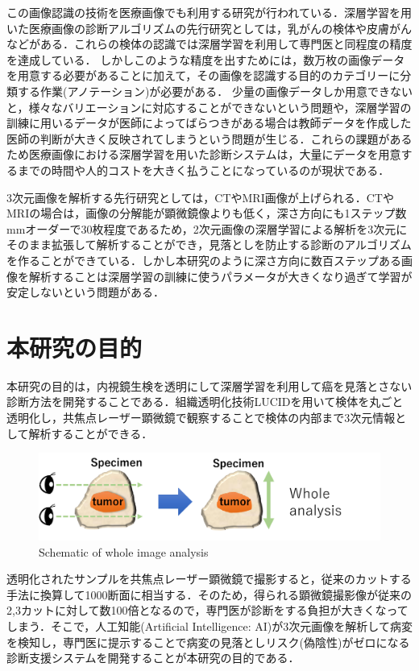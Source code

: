 この画像認識の技術を医療画像でも利用する研究が行われている．深層学習を用いた医療画像の診断アルゴリズムの先行研究としては，乳がん\cite{wang2016deep}の検体や皮膚がん\cite{esteva2017dermatologist}などがある．これらの検体の認識では深層学習を利用して専門医と同程度の精度を達成している．
しかしこのような精度を出すためには，数万枚の画像データを用意する必要があることに加えて，その画像を認識する目的のカテゴリーに分類する作業(アノテーション)が必要がある．
少量の画像データしか用意できないと，様々なバリエーションに対応することができないという問題や，深層学習の訓練に用いるデータが医師によってばらつきがある場合は教師データを作成した医師の判断が大きく反映されてしまうという問題が生じる．これらの課題があるため医療画像における深層学習を用いた診断システムは，大量にデータを用意するまでの時間や人的コストを大きく払うことになっているのが現状である．

3次元画像を解析する先行研究としては，CTやMRI画像が上げられる\cite{dou20163d}．CTやMRIの場合は，画像の分解能が顕微鏡像よりも低く，深さ方向にも1ステップ数mmオーダーで30枚程度であるため，2次元画像の深層学習による解析を3次元にそのまま拡張して解析することができ，見落としを防止する診断のアルゴリズムを作ることができている．しかし本研究のように深さ方向に数百ステップある画像を解析することは深層学習の訓練に使うパラメータが大きくなり過ぎて学習が安定しないという問題がある．

\section{本研究の目的}
本研究の目的は，内視鏡生検を透明にして深層学習を利用して癌を見落とさない診断方法を開発することである．組織透明化技術LUCIDを用いて検体を丸ごと透明化し，共焦点レーザー顕微鏡で観察することで検体の内部まで3次元情報として解析することができる．

\begin{figure}[H]
	\centering
	\includegraphics[width=0.8\linewidth]{fig/chapter1/whole_image_analysis}
	\caption{Schematic of whole image analysis}
	\label{fig:wholeimageanalysis}
\end{figure}

透明化されたサンプルを共焦点レーザー顕微鏡で撮影すると，従来のカットする手法に換算して1000断面に相当する．そのため，得られる顕微鏡撮影像が従来の2,3カットに対して数100倍となるので，専門医が診断をする負担が大きくなってしまう．そこで，人工知能(Artificial Intelligence: AI)が3次元画像を解析して病変を検知し，専門医に提示することで病変の見落としリスク(偽陰性)がゼロになる診断支援システムを開発することが本研究の目的である．

